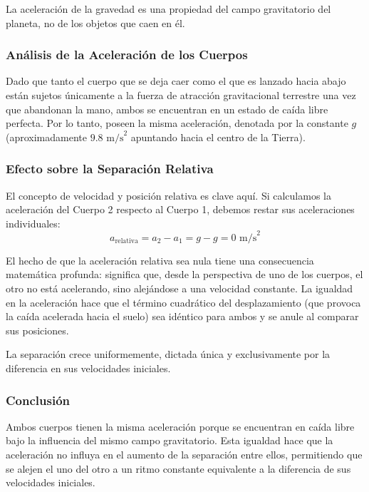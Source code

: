 \documentclass[12pt, a4paper]{article}
\begin{document}
La aceleración de la gravedad es una propiedad del campo gravitatorio del planeta, no de los objetos que caen en él. 

\subsubsection*{Análisis de la Aceleración de los Cuerpos}

Dado que tanto el cuerpo que se deja caer como el que es lanzado hacia abajo están sujetos únicamente a la fuerza de atracción gravitacional terrestre una vez que abandonan la mano, ambos se encuentran en un estado de caída libre perfecta. Por lo tanto, poseen la misma aceleración, denotada por la constante $g$ (aproximadamente $9.8 \text{ m/s}^2$ apuntando hacia el centro de la Tierra).

\subsubsection*{Efecto sobre la Separación Relativa}

El concepto de velocidad y posición relativa es clave aquí. Si calculamos la aceleración del Cuerpo 2 respecto al Cuerpo 1, debemos restar sus aceleraciones individuales:
\begin{equation}
a_{\text{relativa}} = a_2 - a_1 = g - g = 0 \text{ m/s}^2
\end{equation}

El hecho de que la aceleración relativa sea nula tiene una consecuencia matemática profunda: significa que, desde la perspectiva de uno de los cuerpos, el otro no está acelerando, sino alejándose a una velocidad constante. La igualdad en la aceleración hace que el término cuadrático del desplazamiento (que provoca la caída acelerada hacia el suelo) sea idéntico para ambos y se anule al comparar sus posiciones. 

La separación crece uniformemente, dictada única y exclusivamente por la diferencia en sus velocidades iniciales.

\subsubsection*{Conclusión}

Ambos cuerpos tienen la misma aceleración porque se encuentran en caída libre bajo la influencia del mismo campo gravitatorio. Esta igualdad hace que la aceleración no influya en el aumento de la separación entre ellos, permitiendo que se alejen el uno del otro a un ritmo constante equivalente a la diferencia de sus velocidades iniciales.
\end{document}
